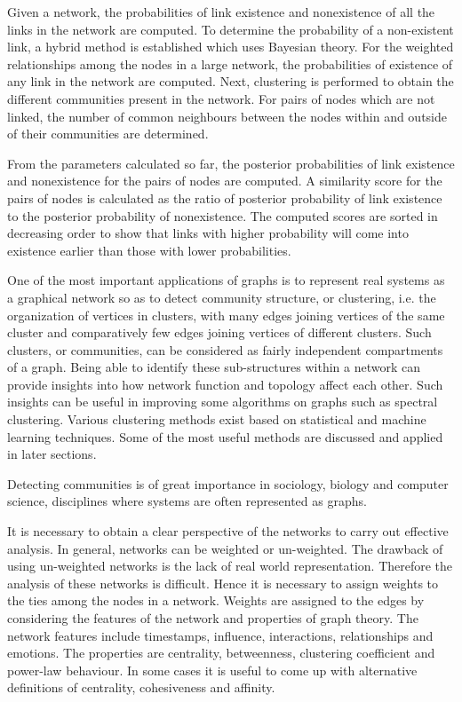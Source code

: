Given a network, the probabilities of link existence and nonexistence of all the links in the network are computed. To determine the probability of a non-existent link, a hybrid method is established which uses Bayesian theory. For the weighted relationships among the nodes in a large network, the probabilities of existence of any link in the network are computed. Next, clustering is performed to obtain the different communities present in the network. For pairs of nodes which are not linked, the number of common neighbours between the nodes within and outside of their communities are determined.

From the parameters calculated so far, the posterior probabilities of link existence and nonexistence for the pairs of nodes are computed. A similarity score for the pairs of nodes is calculated as the ratio of posterior probability of link existence to the posterior probability of nonexistence. The computed scores are sorted in decreasing order to show that links with higher probability will come into existence earlier than those with lower probabilities.


One of the most important applications of graphs is to represent real systems as a graphical network so as to detect community structure, or clustering, i.e. the organization of vertices in clusters, with many edges joining vertices of the same cluster and comparatively few edges joining vertices of different clusters. Such clusters, or communities, can be considered as fairly independent compartments of a graph. Being able to identify these sub-structures within a network can provide insights into how network function and topology affect each other. Such insights can be useful in improving some algorithms on graphs such as spectral clustering. Various clustering methods exist based on statistical
and machine learning techniques. Some of the most useful methods are discussed and applied in later
sections.

Detecting communities is of great importance in sociology, biology and computer science, disciplines where systems are often represented as graphs.



It is necessary to obtain a clear perspective of the networks to carry out effective analysis. In general, networks can be weighted or un-weighted. The drawback of using un-weighted networks is the lack of real world representation. Therefore the analysis of these networks is difficult. Hence it is necessary to assign weights to the ties among the nodes in a network. Weights are assigned to the edges by considering the features of the network and properties of graph theory. The network features include timestamps, influence, interactions, relationships and emotions. The properties are centrality, betweenness, clustering coefficient and power-law behaviour. In some cases it is useful to come up with alternative definitions of centrality, cohesiveness and affinity. 


